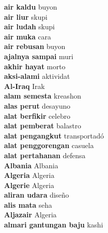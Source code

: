 \textbf{ air kaldu  } buyon \\
\textbf{ air liur  } skupi \\
\textbf{ air ludah  } skupi \\
\textbf{ air muka  } cara \\
\textbf{ air rebusan  } buyon \\
\textbf{ ajalnya sampai  } muri \\
\textbf{ akhir hayat  } morto \\
\textbf{ aksi-alami  } aktividat \\
\textbf{ Al-Iraq  } Irak \\
\textbf{ alam semesta  } kreashon \\
\textbf{ alas perut  } desayuno \\
\textbf{ alat berfikir  } celebro \\
\textbf{ alat pemberat  } balastro \\
\textbf{ alat pengangkut  } transportadó \\
\textbf{ alat penggorengan  } casuela \\
\textbf{ alat pertahanan  } defensa \\
\textbf{ Albania  } Albania \\
\textbf{ Algeria  } Algeria \\
\textbf{ Algerie  } Algeria \\
\textbf{ aliran udara  } diseño \\
\textbf{ alis mata  } seha \\
\textbf{ Aljazair  } Algeria \\
\textbf{ almari gantungan baju  } kashi \\

